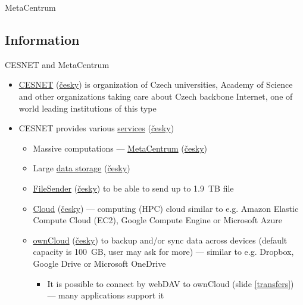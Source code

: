 \documentclass[compress, xelatex, 11pt, xcolor=svgnames, aspectratio=169,
	hyperref={
		bookmarks=true,
		unicode=true,
		colorlinks=true,
		pdftitle={Linux, command line and MetaCentrum},
		plainpages=false,
		pdfauthor={Vojtech Zeisek},
		pdfsubject={Course about use of Linux command line, writing shell scripts and using MetaCentrum of CESNET},
		pdfcreator={XeLaTeX},
		pdfkeywords={Linux, GNU, BASH, shell, command line, MetaCentrum},
		linkcolor=DarkRed, %
		anchorcolor=DarkBlue, %
		citecolor=Indigo, %
		filecolor=NavyBlue, %
		menucolor=DarkMagenta, %
		urlcolor=DarkBlue, %
		},
	url={hyphens, lowtilde} %
	]{beamer}
\begin{document}
\begin{frame}{MetaCentrum}
	\tableofcontents[currentsection, sectionstyle=show/hide, hideothersubsections]
\end{frame}

\subsection{Information}

\begin{frame}[allowframebreaks]{CESNET and MetaCentrum}
	\label{CESNET}
	\begin{itemize}
		\item \href{https://www.cesnet.cz/en}{CESNET} (\href{https://www.cesnet.cz/}{česky}) is organization of Czech universities, Academy of Science and other organizations taking care about Czech backbone Internet, one of world leading institutions of this type
		\item CESNET provides various \href{https://www.cesnet.cz/en/services}{services} (\href{https://www.cesnet.cz/sluzby/}{česky})
		\begin{itemize}
			\item Massive computations --- \href{https://www.cesnet.cz/en/services/computing-2/metacentrum-10}{MetaCentrum} (\href{https://www.cesnet.cz/sluzby/vypocty-2/narocne-vypocty-metacentrum-10}{česky})
			\item Large \href{https://www.cesnet.cz/en/services/data-storage-3}{data storage} (\href{https://www.cesnet.cz/sluzby/datova-uloziste-3/datova-uloziste-13}{česky})
			\item \href{https://www.cesnet.cz/en/services/data-storage-3/filesender-15}{FileSender} (\href{https://www.cesnet.cz/sluzby/datova-uloziste-3/filesender-15}{česky}) to be able to send up to 1.9~TB file
			\item \href{https://www.metacentrum.cz/en/Sluzby/Cloud/}{Cloud} (\href{https://www.metacentrum.cz/cs/Sluzby/Cloud/}{česky}) --- computing (HPC) cloud similar to e.g. Amazon Elastic Compute Cloud (EC2), Google Compute Engine or Microsoft Azure
			\item \href{https://www.cesnet.cz/en/services/data-storage-3/owncloud-16}{ownCloud} (\href{https://www.cesnet.cz/sluzby/datova-uloziste-3/owncloud-16}{česky}) to backup and/or sync data across devices (default capacity is 100~GB, user may ask for more) --- similar to e.g. Dropbox, Google Drive or Microsoft OneDrive
			\begin{itemize}
				\item It is possible to connect by webDAV to ownCloud (slide \ref{transfers}) --- many applications support it

\end{itemize}
\end{itemize}
\end{itemize}
\end{frame}
\end{document}
